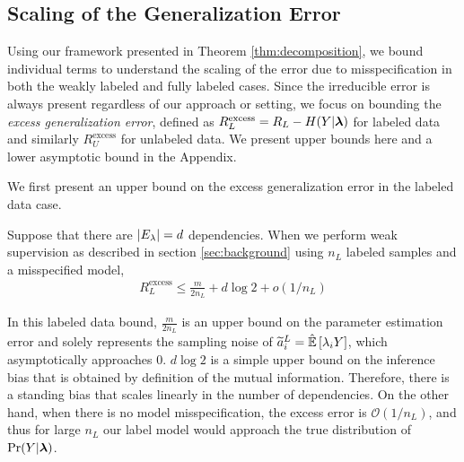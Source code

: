 \subsection{Scaling of the Generalization Error} %
\label{subsec:scaling}

Using our framework presented in Theorem \ref{thm:decomposition}, we bound individual terms to understand the scaling of the error due to misspecification in both the weakly labeled and fully labeled cases. Since the irreducible error is always present regardless of our approach or setting, we focus on bounding the \textit{excess generalization error}, defined as $R^{\mathrm{excess}}_L = R_L -  H(Y|\bm{\lambda})$ for labeled data and similarly $R^{\mathrm{excess}}_U$ for unlabeled data. We present upper bounds here and a lower asymptotic bound in the Appendix.

We first present an upper bound on the excess generalization error in the labeled data case.
\begin{theorem}
Suppose that there are $|E_{\lambda}| = d$ dependencies. When we perform weak supervision as described in section \ref{sec:background} using $n_L$ labeled samples and a misspecified model,
\begin{align}
   R_L^{\mathrm{excess}} \le \frac{m}{2n_L} + d \log 2 + o(1/n_L) 
\end{align}
\label{thm:labeled}
\end{theorem}

In this labeled data bound, $\frac{m}{2n_L}$ is an upper bound on the parameter estimation error and solely represents the sampling noise of $\widetilde{a}_i^L = \hat{\mathbb{E}}\left[\lambda_i Y\right]$, which asymptotically approaches $0$. $d\log 2$ is a simple upper bound on the inference bias that is obtained by definition of the mutual information. Therefore, there is a standing bias that scales linearly in the number of dependencies. On the other hand, when there is no model misspecification, the excess error is $\mathcal{O}(1/n_L)$, and thus for large $n_L$ our label model would approach the true distribution of $\Pr(Y | \bm{\lambda})$.  

